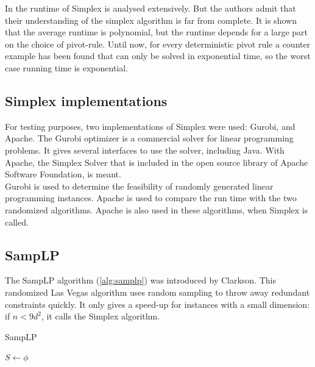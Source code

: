 \documentclass[nocopyrightspace]{acm_proc_article-sp}
\begin{document}
In \cite{spielman2004smoothed} the runtime of Simplex is analysed extensively. But the authors admit that their understanding of the simplex algorithm is far from complete. It is shown that the average runtime is polynomial, but the runtime depends for a large part on the choice of pivot-rule.  Until now, for every deterministic pivot rule a counter example has been found that can only be solved in exponential time, so the worst case running time is exponential.
                         

\subsection{Simplex implementations}
For testing purposes, two implementations of Simplex were used: Gurobi, and Apache. The Gurobi optimizer is a commercial solver for linear programming problems. It gives several interfaces to use the solver, including Java. With Apache, the Simplex Solver that is included in the open source library of Apache Software Foundation, is meant.\\
Gurobi is used to determine the feasibility of randomly generated linear programming instances. Apache is used to compare the run time with the two randomized algorithms. Apache is also used in these algorithms, when Simplex is called.

\subsection{SampLP}
The SampLP algorithm (\ref{alg:samplp}) was introduced by Clarkson\cite{clarkson1988vegas}. This randomized Las Vegas algorithm uses random sampling to throw away redundant constraints quickly. It only gives a speed-up for instances with a small dimension: if $n<9d^2$, it calls the Simplex algorithm. 


\begin{algorithm}[h]
\label{alg:samplp}
\caption{SampLP}
$S \gets \phi$\;
\end{algorithm}
\end{document}
